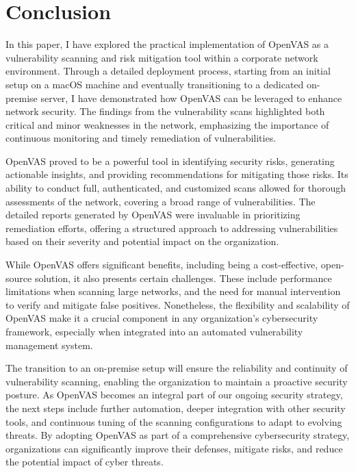 \documentclass[twocolumn]{article}
\begin{document}
\section{Conclusion}

In this paper, I have explored the practical implementation of OpenVAS as a vulnerability scanning and risk mitigation tool within a corporate network environment. Through a detailed deployment process, starting from an initial setup on a macOS machine and eventually transitioning to a dedicated on-premise server, I have demonstrated how OpenVAS can be leveraged to enhance network security. The findings from the vulnerability scans highlighted both critical and minor weaknesses in the network, emphasizing the importance of continuous monitoring and timely remediation of vulnerabilities.

OpenVAS proved to be a powerful tool in identifying security risks, generating actionable insights, and providing recommendations for mitigating those risks. Its ability to conduct full, authenticated, and customized scans allowed for thorough assessments of the network, covering a broad range of vulnerabilities. The detailed reports generated by OpenVAS were invaluable in prioritizing remediation efforts, offering a structured approach to addressing vulnerabilities based on their severity and potential impact on the organization.

While OpenVAS offers significant benefits, including being a cost-effective, open-source solution, it also presents certain challenges. These include performance limitations when scanning large networks, and the need for manual intervention to verify and mitigate false positives. Nonetheless, the flexibility and scalability of OpenVAS make it a crucial component in any organization’s cybersecurity framework, especially when integrated into an automated vulnerability management system.

The transition to an on-premise setup will ensure the reliability and continuity of vulnerability scanning, enabling the organization to maintain a proactive security posture. As OpenVAS becomes an integral part of our ongoing security strategy, the next steps include further automation, deeper integration with other security tools, and continuous tuning of the scanning configurations to adapt to evolving threats. By adopting OpenVAS as part of a comprehensive cybersecurity strategy, organizations can significantly improve their defenses, mitigate risks, and reduce the potential impact of cyber threats.
\end{document}
